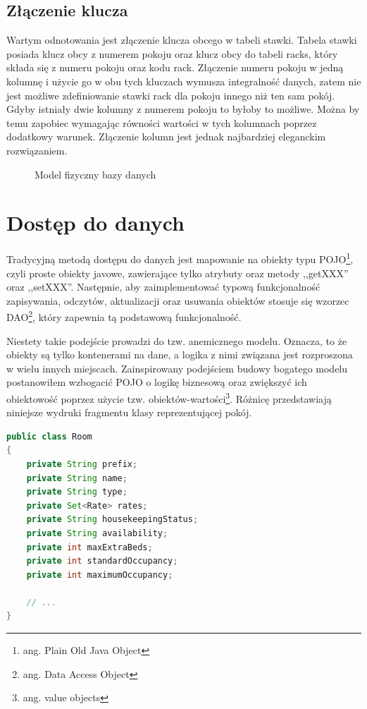 \documentclass[a4paper,onecolumn,oneside,11pt,wide,floatssmall]{mwrep}
\theoremstyle{definition}
\theoremstyle{plain}%
\theoremstyle{remark}
\begin{document}
\subsection{Złączenie klucza}
Wartym odnotowania jest złączenie klucza obcego w tabeli stawki. Tabela stawki posiada klucz obcy z numerem pokoju oraz klucz obcy do tabeli racks, który składa się z numeru pokoju oraz kodu rack. Złączenie numeru pokoju w jedną kolumnę i użycie go w obu tych kluczach wymusza integralność danych, zatem nie jest możliwe zdefiniowanie stawki rack dla pokoju innego niż ten sam pokój. Gdyby istniały dwie kolumny z numerem pokoju to byłoby to możliwe. Można by temu zapobiec wymagając równości wartości w tych kolumnach poprzez dodatkowy warunek. Złączenie kolumn jest jednak najbardziej eleganckim rozwiązaniem.

\begin{figure}[H]
  \begin{center}
  \end{center}
  \caption{Model fizyczny bazy danych}
  \label{fig:db-physical-model}
\end{figure}

\section{Dostęp do danych}
Tradycyjną metodą dostępu do danych jest mapowanie na obiekty typu POJO\footnote{ang. Plain Old Java Object}, czyli proste obiekty javowe, zawierające tylko atrybuty oraz metody ,,getXXX'' oraz ,,setXXX''. Następnie, aby zaimplementować typową funkcjonalność zapisywania, odczytów, aktualizacji oraz usuwania obiektów stosuje się wzorzec DAO\footnote{ang. Data Access Object}, który zapewnia tą podstawową funkcjonalność.

Niestety takie podejście prowadzi do tzw. anemicznego modelu. Oznacza, to że obiekty są tylko kontenerami na dane, a logika z nimi związana jest rozproszona w wielu innych miejscach. Zainspirowany podejściem budowy bogatego modelu \cite{evans2004domain} postanowiłem wzbogacić POJO o logikę biznesową oraz zwiększyć ich obiektowość poprzez użycie tzw. obiektów-wartości\footnote{ang. value objects}. Różnicę przedstawiają niniejsze wydruki fragmentu klasy reprezentującej pokój. 

\begin{lstlisting}[language=Java,style=outcode,caption=POJO]
public class Room
{
    private String prefix; 
    private String name;
    private String type;
    private Set<Rate> rates;
    private String housekeepingStatus;
    private String availability;
    private int maxExtraBeds;
    private int standardOccupancy;
    private int maximumOccupancy;

    // ...
}
\end{lstlisting}
\end{document}
